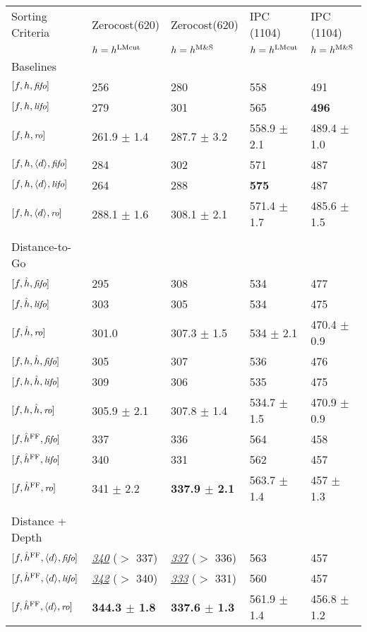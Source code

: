 \begin{center}
\begin{tabular}{|l|ll|ll|}
Sorting Criteria & Zerocost(620) & Zerocost(620) & IPC (1104) & IPC (1104)\\
 & $h=\text{$h^\text{LMcut}$}$ & $h=\text{$h^\text{M\&S}$}$ & $h=\text{$h^\text{LMcut}$}$ & $h=\text{$h^\text{M\&S}$}$\\
Baselines &  &  &  & \\
$[f,h,{\small\textit{fifo}}]$ & 256 & 280 & 558 & 491\\
$[f,h,{\small\textit{lifo}}]$ & 279 & 301 & 565 & \textbf{496}\\
$[f,h,{\small\textit{ro}}]$ & 261.9 $\pm$ 1.4 & 287.7 $\pm$ 3.2 & 558.9 $\pm$ 2.1 & 489.4 $\pm$ 1.0\\
$[f,h,{\left<d\right>},{\small\textit{fifo}}]$ & 284 & 302 & 571 & 487\\
$[f,h,{\left<d\right>},{\small\textit{lifo}}]$ & 264 & 288 & \textbf{575} & 487\\
$[f,h,{\left<d\right>},{\small\textit{ro}}]$ & 288.1 $\pm$ 1.6 & 308.1 $\pm$ 2.1 & 571.4 $\pm$ 1.7 & 485.6 $\pm$ 1.5\\
 &  &  &  & \\
Distance-to-Go &  &  &  & \\
$[f,\hat{h},{\small\textit{fifo}}]$ & 295 & 308 & 534 & 477\\
$[f,\hat{h},{\small\textit{lifo}}]$ & 303 & 305 & 534 & 475\\
$[f,\hat{h},{\small\textit{ro}}]$ & 301.0 & 307.3 $\pm$ 1.5 & 534 $\pm$ 2.1 & 470.4 $\pm$ 0.9\\
$[f,h,\hat{h},{\small\textit{fifo}}]$ & 305 & 307 & 536 & 476\\
$[f,h,\hat{h},{\small\textit{lifo}}]$ & 309 & 306 & 535 & 475\\
$[f,h,\hat{h},{\small\textit{ro}}]$ & 305.9 $\pm$ 2.1 & 307.8 $\pm$ 1.4 & 534.7 $\pm$ 1.5 & 470.9 $\pm$ 0.9\\
$[f,{\hat{h}^{\text{FF}}},{\small\textit{fifo}}]$ & 337 & 336 & 564 & 458\\
$[f,{\hat{h}^{\text{FF}}},{\small\textit{lifo}}]$ & 340 & 331 & 562 & 457\\
$[f,{\hat{h}^{\text{FF}}},{\small\textit{ro}}]$ & 341 $\pm$ 2.2 & \textbf{337.9 $\pm$ 2.1} & 563.7 $\pm$ 1.4 & 457 $\pm$ 1.3\\
 &  &  &  & \\
Distance + Depth &  &  &  & \\
$[f,{\hat{h}^{\text{FF}}},{\left<d\right>},{\small\textit{fifo}}]$ & \uline{\emph{340}} ($>$ 337) & \uline{\emph{337}} ($>$ 336) & 563 & 457\\
$[f,{\hat{h}^{\text{FF}}},{\left<d\right>},{\small\textit{lifo}}]$ & \uline{\emph{342}} ($>$ 340) & \uline{\emph{333}} ($>$ 331) & 560 & 457\\
$[f,{\hat{h}^{\text{FF}}},{\left<d\right>},{\small\textit{ro}}]$ & \textbf{344.3 $\pm$ 1.8} & \textbf{337.6 $\pm$ 1.3} & 561.9 $\pm$ 1.4 & 456.8 $\pm$ 1.2\\
\end{tabular}
\end{center}
